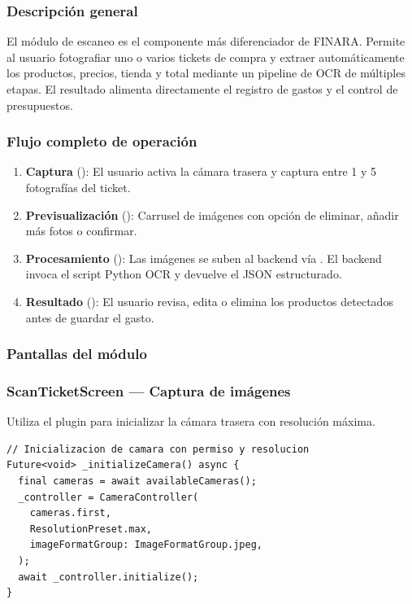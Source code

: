 \subsubsection{Descripción general}

El módulo de escaneo es el componente más diferenciador de FINARA. Permite
al usuario fotografiar uno o varios tickets de compra y extraer
automáticamente los productos, precios, tienda y total mediante un pipeline
de OCR de múltiples etapas. El resultado alimenta directamente el registro
de gastos y el control de presupuestos.

\subsubsection*{Flujo completo de operación}

\begin{enumerate}
  \item \textbf{Captura} (): El usuario activa la
    cámara trasera y captura entre 1 y 5 fotografías del ticket.
  \item \textbf{Previsualización} (): Carrusel de
    imágenes con opción de eliminar, añadir más fotos o confirmar.
  \item \textbf{Procesamiento} (): Las imágenes
    se suben al backend vía . El backend invoca
    el script Python OCR y devuelve el JSON estructurado.
  \item \textbf{Resultado} (): El usuario revisa,
    edita o elimina los productos detectados antes de guardar el gasto.
\end{enumerate}

\subsubsection{Pantallas del módulo}

\subsubsection*{ScanTicketScreen — Captura de imágenes}

Utiliza el plugin  para inicializar la cámara trasera con
resolución máxima.

\begin{lstlisting}[style=dart,
    caption={Inicialización de cámara en ScanTicketScreen}]
// Inicializacion de camara con permiso y resolucion
Future<void> _initializeCamera() async {
  final cameras = await availableCameras();
  _controller = CameraController(
    cameras.first,
    ResolutionPreset.max,
    imageFormatGroup: ImageFormatGroup.jpeg,
  );
  await _controller.initialize();
}
\end{lstlisting}

